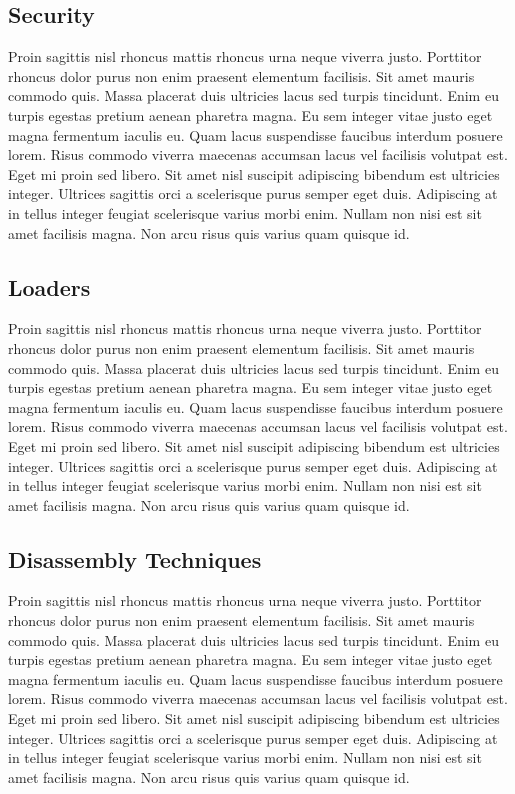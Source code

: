 \documentclass[a4paper,12pt]{article}
\begin{document}
\begin{multicols}{2}
\subsection{Security}
Proin sagittis nisl rhoncus mattis rhoncus urna neque viverra justo. Porttitor rhoncus dolor purus non enim praesent elementum facilisis. Sit amet mauris commodo quis. Massa placerat duis ultricies lacus sed turpis tincidunt. Enim eu turpis egestas pretium aenean pharetra magna. Eu sem integer vitae justo eget magna fermentum iaculis eu. Quam lacus suspendisse faucibus interdum posuere lorem. Risus commodo viverra maecenas accumsan lacus vel facilisis volutpat est. Eget mi proin sed libero. Sit amet nisl suscipit adipiscing bibendum est ultricies integer. Ultrices sagittis orci a scelerisque purus semper eget duis. Adipiscing at in tellus integer feugiat scelerisque varius morbi enim. Nullam non nisi est sit amet facilisis magna. Non arcu risus quis varius quam quisque id.

\subsection{Loaders}
Proin sagittis nisl rhoncus mattis rhoncus urna neque viverra justo. Porttitor rhoncus dolor purus non enim praesent elementum facilisis. Sit amet mauris commodo quis. Massa placerat duis ultricies lacus sed turpis tincidunt. Enim eu turpis egestas pretium aenean pharetra magna. Eu sem integer vitae justo eget magna fermentum iaculis eu. Quam lacus suspendisse faucibus interdum posuere lorem. Risus commodo viverra maecenas accumsan lacus vel facilisis volutpat est. Eget mi proin sed libero. Sit amet nisl suscipit adipiscing bibendum est ultricies integer. Ultrices sagittis orci a scelerisque purus semper eget duis. Adipiscing at in tellus integer feugiat scelerisque varius morbi enim. Nullam non nisi est sit amet facilisis magna. Non arcu risus quis varius quam quisque id.

\subsection{Disassembly Techniques}
Proin sagittis nisl rhoncus mattis rhoncus urna neque viverra justo. Porttitor rhoncus dolor purus non enim praesent elementum facilisis. Sit amet mauris commodo quis. Massa placerat duis ultricies lacus sed turpis tincidunt. Enim eu turpis egestas pretium aenean pharetra magna. Eu sem integer vitae justo eget magna fermentum iaculis eu. Quam lacus suspendisse faucibus interdum posuere lorem. Risus commodo viverra maecenas accumsan lacus vel facilisis volutpat est. Eget mi proin sed libero. Sit amet nisl suscipit adipiscing bibendum est ultricies integer. Ultrices sagittis orci a scelerisque purus semper eget duis. Adipiscing at in tellus integer feugiat scelerisque varius morbi enim. Nullam non nisi est sit amet facilisis magna. Non arcu risus quis varius quam quisque id.


\end{multicols}
\end{document}
